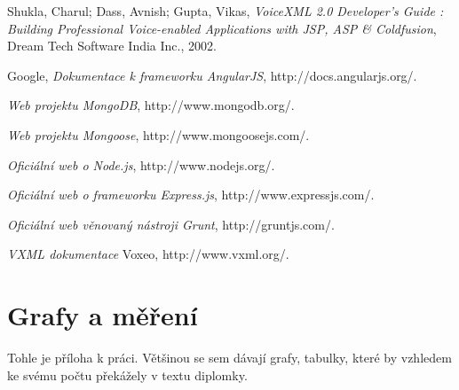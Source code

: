 \documentclass[ing,male,java,dept460]{diploma}						%
\begin{document}
\begin{thebibliography}{99}

 Shukla, Charul; Dass, Avnish; Gupta, Vikas,
\textit{VoiceXML 2.0 Developer's Guide : Building Professional Voice-enabled Applications with JSP, ASP & Coldfusion}, Dream Tech Software India Inc., 2002.

 Google,
\textit{Dokumentace k frameworku AngularJS}, http://docs.angularjs.org/.

\textit{Web projektu MongoDB}, http://www.mongodb.org/.

\textit{Web projektu Mongoose}, http://www.mongoosejs.com/.

\textit{Oficiální web o Node.js}, http://www.nodejs.org/.

\textit{Oficiální web o frameworku Express.js}, http://www.expressjs.com/.

\textit{Oficiální web věnovaný nástroji Grunt}, http://gruntjs.com/.

\textit{VXML dokumentace} Voxeo, http://www.vxml.org/.

\end{thebibliography}

\appendix
\section{Grafy a měření}
Tohle je příloha k práci. Většinou se sem dávají grafy, tabulky, které by vzhledem
ke svému počtu překážely v textu diplomky.
\clearpage
\end{document}
